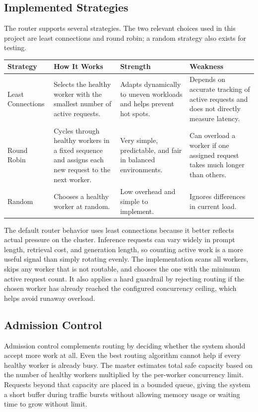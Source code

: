 \subsection{Implemented Strategies}
The router supports several strategies. The two relevant choices used in this project are least connections and round robin; a random strategy also exists for testing.

\begin{table}[H]
  \centering
  \renewcommand{\arraystretch}{1.2}
  \begin{tabularx}{\textwidth}{@{}lX X X@{}}
    \toprule
    \textbf{Strategy} & \textbf{How It Works} & \textbf{Strength} & \textbf{Weakness} \\
    \midrule
    Least Connections & Selects the healthy worker with the smallest number of active requests. & Adapts dynamically to uneven workloads and helps prevent hot spots. & Depends on accurate tracking of active requests and does not directly measure latency. \\
    Round Robin & Cycles through healthy workers in a fixed sequence and assigns each new request to the next worker. & Very simple, predictable, and fair in balanced environments. & Can overload a worker if one assigned request takes much longer than others. \\
    Random & Chooses a healthy worker at random. & Low overhead and simple to implement. & Ignores differences in current load. \\
    \bottomrule
  \end{tabularx}
\end{table}

The default router behavior uses least connections because it better reflects actual pressure on the cluster. Inference requests can vary widely in prompt length, retrieval cost, and generation length, so counting active work is a more useful signal than simply rotating evenly. The implementation scans all workers, skips any worker that is not routable, and chooses the one with the minimum active request count. It also applies a hard guardrail by rejecting routing if the chosen worker has already reached the configured concurrency ceiling, which helps avoid runaway overload.

\subsection{Admission Control}
Admission control complements routing by deciding whether the system should accept more work at all. Even the best routing algorithm cannot help if every healthy worker is already busy. The master estimates total safe capacity based on the number of healthy workers multiplied by the per-worker concurrency limit. Requests beyond that capacity are placed in a bounded queue, giving the system a short buffer during traffic bursts without allowing memory usage or waiting time to grow without limit.


